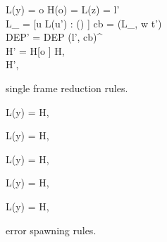 \begin{figure}[h]
  \RuleSpace{}

  {L(y) = o \andalso H(o) =  \andalso L(z) = l' \\
  L_{} = [u \mapsto L(u') : () \in {}]
  \andalso cb = (L_{}, w \Rightarrow t') \\
  \iota{} \andalso DEP' = DEP \cup (l', cb)^\iota \\
  H' = H[o \mapsto {}] }
  { H,  \\ \FRedTo \;
  H',  }
  \caption{\RACL{} single frame reduction rules.}
  \label{fig:frame_red_rules}
\end{figure}


\begin{figure}
  {L(y) = \NullVal}
  {H,  \; \FRedTo \; \Error}

  \RuleSpace{}

  {L(y) = \NullVal}
  {H,  \; \FRedTo \; \Error}

  \RuleSpace{}

  {L(y) = \NullVal}
  {H,  \; \FRedTo \; \Error}

  \RuleSpace{}

  {L(y) = \NullVal}
  {H,  \; \FRedTo \; \Error}

  \RuleSpace{}

  {L(y) = \NullVal}
  {H,   \\ \FRedTo \; \Error}
  \caption{\RACL{} error spawning rules.}
  \label{fig:error_red_rules}
\end{figure}


